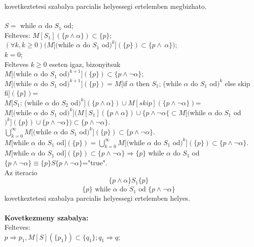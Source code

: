 \documentclass[a4paper,10pt]{article}
\begin{document}
kovetkeztetesi szabalya parcialis helyessegi ertelemben megbizhato.\\
\\
$S=$ while $\alpha$ do $S_1$ od;\\
Felteves: $M[S_1](\lbrace p\wedge\alpha\rbrace)\subset\lbrace p\rbrace$;\\
$(\forall k, k\ge0)(M[($while $\alpha$ do $S_1$ od$)^k](\lbrace p\rbrace) \subset \lbrace p\wedge~\alpha\rbrace)$;\\
$k=0$;\\
Felteves $k\ge0$ eseten igaz, bizonyitsuk\\
$M[($while $\alpha$ do $S_1$ od$)^{k+1}](\lbrace p\rbrace) \subset \lbrace p\wedge\neg\alpha\rbrace$;\\
$M[($while $\alpha$ do $S_1$ od$)^{k+1}](\lbrace p\rbrace)=M[$if $\alpha$ then $S_1$; (while $\alpha$ do $S_1$ od$)^k$ else skip fi$](\lbrace p\rbrace)$=\\
$M[S_1$; (while $\alpha$ do $S_2$ od$)^k](\lbrace p\wedge \alpha\rbrace)\cup M[skip](\lbrace p\wedge\neg\alpha\rbrace)$=\\
$M[($while $\alpha$ do $S_1$ od$)^k](M[S_1](\lbrace p\wedge\alpha\rbrace)\cup \lbrace p\wedge\neg\alpha\lbrace\subset
M[($while $\alpha$ do $S_1$ od$)^k](\lbrace p\rbrace) \cup \lbrace p\wedge\neg\alpha\rbrace)\subset\lbrace p\wedge\neg\alpha\rbrace$.\\
$\bigcup_{k=0}^\infty M[($while $\alpha$ do $S_1$ od$)^k](\lbrace p\rbrace) \subset \lbrace p\wedge \neg\alpha\rbrace$.\\
$M[$while $\alpha$ do $S_1$ od$](\lbrace p\rbrace) = \bigcup_{k=0}^\infty M[($while $\alpha$ do $S_1$ od$)^k](\lbrace p\rbrace) \subset \lbrace p\wedge\neg\alpha\rbrace$.\\
$M[$while $\alpha$ do $S_1$ od$](\lbrace p\rbrace) \subset \lbrace p\wedge\neg\alpha\rbrace \Rightarrow \lbrace p\rbrace$ while $\alpha$ do $S_1$ od $\lbrace p\wedge\neg\alpha\rbrace \equiv \lbrace p\rbrace S\lbrace p\wedge\neg\alpha\rbrace$="true".\\
Az iteracio
$$\underline{\lbrace p\wedge\alpha\rbrace S_1 \lbrace p\rbrace}$$
$$\lbrace p\rbrace \text{ while } \alpha \text{ do } S_1\text{ od } \lbrace p\wedge\neg\alpha\rbrace$$
kovetkeztetesi szabalya parcialis helyessegi ertelemben helyes.\\
\\
\textbf{Kovetkezmeny szabalya:}\\
Felteves:\\
$p\Rightarrow p_1, M[S](\lbrace p_1\rbrace)\subset\lbrace q_1\rbrace; q_1\Rightarrow q$;\\
\end{document}
